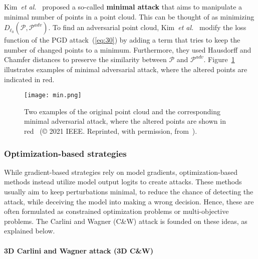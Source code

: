 \documentclass{ieeeaccess}
\def\etal{\textit{et al.}}
\begin{document}
Kim~\etal~\cite{kim2021minimal} proposed a so-called \textbf{minimal attack} that aims to manipulate a minimal number of points in a point cloud. This can be thought of as minimizing $D_{\ell_0}  (\mathcal{P} , \mathcal{P}^{adv})$. To find an adversarial point cloud, Kim~\etal~ modify the loss function of the PGD attack~(\ref{eq:30}) by adding a term that tries to keep the number of changed points to a minimum. Furthermore, they used Hausdorff and Chamfer distances to preserve the similarity between $\mathcal{P}$ and $\mathcal{P}^{adv}$. Figure~\ref{fig_min} illustrates examples of minimal adversarial attack, where the altered points are indicated in red.

\begin{figure}
    \centering
    \texttt{[image: min.png]}
    \caption{Two examples of the original point cloud and the corresponding minimal adversarial attack, where the altered points are shown in red~\cite{kim2021minimal} (© 2021 IEEE. Reprinted, with permission, from~\cite{kim2021minimal}).}
    \label{fig_min}
\end{figure}



\subsubsection{Optimization-based strategies}
\label{subsubsec:optimization-based}

While gradient-based strategies rely on model gradients, optimization-based methods instead utilize model output logits to create attacks. These methods usually aim to keep perturbations minimal, to reduce the chance of detecting the attack, while deceiving the model into making a wrong decision. Hence, these are often formulated as constrained optimization problems or multi-objective problems. %
The Carlini and Wagner (C\&W) attack is founded on these ideas, as explained below.

\paragraph{3D Carlini and Wagner attack (3D C\&W)}
\label{subsubsubsec:C&W}
\end{document}
